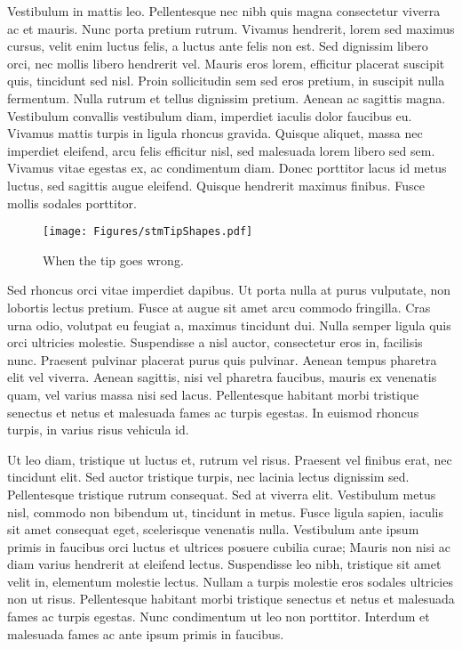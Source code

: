 Vestibulum in mattis leo. Pellentesque nec nibh quis magna consectetur viverra ac et mauris. Nunc porta pretium rutrum. Vivamus hendrerit, lorem sed maximus cursus, velit enim luctus felis, a luctus ante felis non est. Sed dignissim libero orci, nec mollis libero hendrerit vel. Mauris eros lorem, efficitur placerat suscipit quis, tincidunt sed nisl. Proin sollicitudin sem sed eros pretium, in suscipit nulla fermentum. Nulla rutrum et tellus dignissim pretium. Aenean ac sagittis magna. Vestibulum convallis vestibulum diam, imperdiet iaculis dolor faucibus eu. Vivamus mattis turpis in ligula rhoncus gravida. Quisque aliquet, massa nec imperdiet eleifend, arcu felis efficitur nisl, sed malesuada lorem libero sed sem. Vivamus vitae egestas ex, ac condimentum diam. Donec porttitor lacus id metus luctus, sed sagittis augue eleifend. Quisque hendrerit maximus finibus. Fusce mollis sodales porttitor.

    \begin{figure}
        \centering
        \texttt{[image: Figures/stmTipShapes.pdf]}
        \caption{When the tip goes wrong. }
        \label{fig:tip shapes}
    \end{figure}


Sed rhoncus orci vitae imperdiet dapibus. Ut porta nulla at purus vulputate, non lobortis lectus pretium. Fusce at augue sit amet arcu commodo fringilla. Cras urna odio, volutpat eu feugiat a, maximus tincidunt dui. Nulla semper ligula quis orci ultricies molestie. Suspendisse a nisl auctor, consectetur eros in, facilisis nunc. Praesent pulvinar placerat purus quis pulvinar. Aenean tempus pharetra elit vel viverra. Aenean sagittis, nisi vel pharetra faucibus, mauris ex venenatis quam, vel varius massa nisi sed lacus. Pellentesque habitant morbi tristique senectus et netus et malesuada fames ac turpis egestas. In euismod rhoncus turpis, in varius risus vehicula id.

Ut leo diam, tristique ut luctus et, rutrum vel risus. Praesent vel finibus erat, nec tincidunt elit. Sed auctor tristique turpis, nec lacinia lectus dignissim sed. Pellentesque tristique rutrum consequat. Sed at viverra elit. Vestibulum metus nisl, commodo non bibendum ut, tincidunt in metus. Fusce ligula sapien, iaculis sit amet consequat eget, scelerisque venenatis nulla. Vestibulum ante ipsum primis in faucibus orci luctus et ultrices posuere cubilia curae; Mauris non nisi ac diam varius hendrerit at eleifend lectus. Suspendisse leo nibh, tristique sit amet velit in, elementum molestie lectus. Nullam a turpis molestie eros sodales ultricies non ut risus. Pellentesque habitant morbi tristique senectus et netus et malesuada fames ac turpis egestas. Nunc condimentum ut leo non porttitor. Interdum et malesuada fames ac ante ipsum primis in faucibus.

